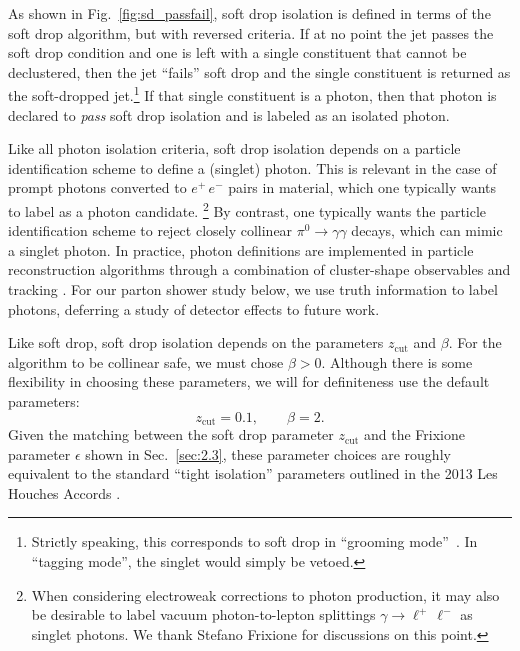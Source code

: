 \documentclass[a4paper,11pt]{article}
\DeclareRobustCommand{\Sec}[1]{Sec.~\ref{#1}}
\DeclareRobustCommand{\Fig}[1]{Fig.~\ref{#1}}
\begin{document}
As shown in \Fig{fig:sd_passfail}, soft drop isolation is defined in terms of the soft drop algorithm, but with reversed criteria. 
%
If at no point the jet passes the soft drop condition and one is left with a single constituent that cannot be declustered, then the jet ``fails'' soft drop and the single constituent is returned as the soft-dropped jet.\footnote{Strictly speaking, this corresponds to soft drop in ``grooming mode''~\cite{Larkoski:2014wba}.  In ``tagging mode'', the singlet would simply be vetoed.}
%
If that single constituent is a photon, then that photon is declared to \textit{pass} soft drop isolation and is labeled as an isolated photon.

Like all photon isolation criteria, soft drop isolation depends on a particle identification scheme to define a (singlet) photon.
%
This is relevant in the case of prompt photons converted to $e^+\,e^-$ pairs in material, which one typically wants to label as a photon candidate.%
%
\footnote{When considering electroweak corrections to photon production, it may also be desirable to label vacuum photon-to-lepton splittings $\gamma \rightarrow \ell^+\,\ell^-$ as singlet photons.  We thank Stefano Frixione for discussions on this point.} 
%
By contrast, one typically wants the particle identification scheme to reject closely collinear $\pi^0 \rightarrow \gamma \gamma$ decays, which can mimic a singlet photon.
%
In practice, photon definitions are implemented in particle reconstruction algorithms through a combination of cluster-shape observables and tracking \cite{Sirunyan:2017ulk,Aaboud:2017aca}.
%
For our parton shower study below, we use truth information to label photons, deferring a study of detector effects to future work.

Like soft drop, soft drop isolation depends on the parameters $z_{\text{cut}}$ and $\beta$.
%
For the algorithm to be collinear safe, we must chose $\beta > 0$.
%
Although there is some flexibility in choosing these parameters, we will for definiteness use the default parameters:
%
\begin{equation}
z_{\text{cut}} = 0.1, \qquad \beta = 2.
\end{equation}
%
Given the matching between the soft drop parameter $z_{\text{cut}}$ and the Frixione parameter $\epsilon$ shown in \Sec{sec:2.3}, these parameter choices are roughly equivalent to the standard ``tight isolation'' parameters outlined in the 2013 Les Houches Accords \cite{Andersen:2014efa}.
\end{document}
